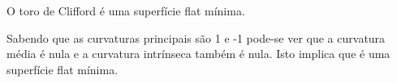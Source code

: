 \begin{proposicao}
	O toro de Clifford é uma superfície flat mínima.
\end{proposicao}

\begin{demonstracao}
	Sabendo que as curvaturas principais são 1 e -1 pode-se ver que a curvatura média é nula e a curvatura intrínseca também é nula. Isto implica que é uma superfície flat mínima.
\end{demonstracao}

